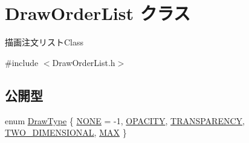 \hypertarget{class_draw_order_list}{}\section{Draw\+Order\+List クラス}
\label{class_draw_order_list}


描画注文リスト\+Class  




{\ttfamily \#include $<$Draw\+Order\+List.\+h$>$}

\subsection*{公開型}
\begin{DoxyCompactItemize}
\item 
enum \mbox{\hyperlink{class_draw_order_list_a6c9b9ceb312c16d399ef355f4f3486bb}{Draw\+Type}} \{ \newline
\mbox{\hyperlink{class_draw_order_list_a6c9b9ceb312c16d399ef355f4f3486bbab2a83851af51b7cbf059ef9522ab908f}{N\+O\+NE}} = -\/1, 
\mbox{\hyperlink{class_draw_order_list_a6c9b9ceb312c16d399ef355f4f3486bba4c769c665704d5a6d9a3fa1fa34966fb}{O\+P\+A\+C\+I\+TY}}, 
\mbox{\hyperlink{class_draw_order_list_a6c9b9ceb312c16d399ef355f4f3486bba38e4ff40be41d3ca753da42d6a628173}{T\+R\+A\+N\+S\+P\+A\+R\+E\+N\+CY}}, 
\mbox{\hyperlink{class_draw_order_list_a6c9b9ceb312c16d399ef355f4f3486bba3e5454163533de348e3b3a819e75eb6c}{T\+W\+O\+\_\+\+D\+I\+M\+E\+N\+S\+I\+O\+N\+AL}}, 
\newline
\mbox{\hyperlink{class_draw_order_list_a6c9b9ceb312c16d399ef355f4f3486bba6af2a2923ac1094762cf45ca43fc12ab}{M\+AX}}
 \}
\end{DoxyCompactItemize}
